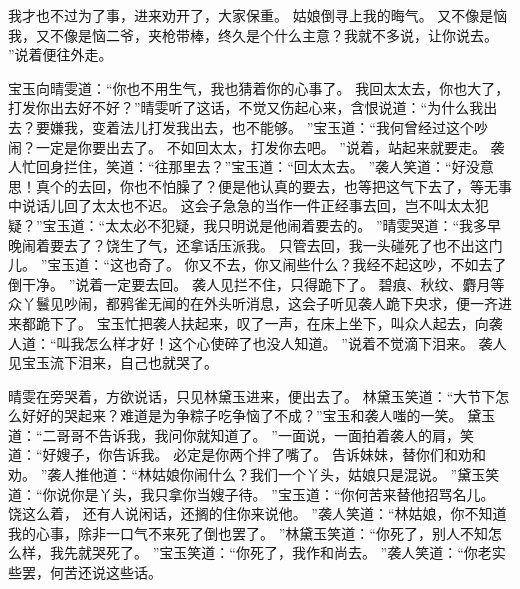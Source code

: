 我才也不过为了事，进来劝开了，大家保重。
姑娘倒寻上我的晦气。
又不像是恼我，又不像是恼二爷，夹枪带棒，终久是个什么主意？我就不多说，让你说去。
”说着便往外走。
\par
宝玉向晴雯道：“你也不用生气，我也猜着你的心事了。
我回太太去，你也大了，打发你出去好不好？”晴雯听了这话，不觉又伤起心来，含恨说道：“为什么我出去？要嫌我，变着法儿打发我出去，也不能够。
”宝玉道：“我何曾经过这个吵闹？一定是你要出去了。
不如回太太，打发你去吧。
”说着，站起来就要走。
袭人忙回身拦住，笑道：“往那里去？”宝玉道：“回太太去。
”袭人笑道：“好没意思！真个的去回，你也不怕臊了？便是他认真的要去，也等把这气下去了，等无事中说话儿回了太太也不迟。
这会子急急的当作一件正经事去回，岂不叫太太犯疑？”宝玉道：“太太必不犯疑，我只明说是他闹着要去的。
”晴雯哭道：“我多早晚闹着要去了？饶生了气，还拿话压派我。
只管去回，我一头碰死了也不出这门儿。
”宝玉道：“这也奇了。
你又不去，你又闹些什么？我经不起这吵，不如去了倒干净。
”说着一定要去回。
袭人见拦不住，只得跪下了。
碧痕、秋纹、麝月等众丫鬟见吵闹，都鸦雀无闻的在外头听消息，这会子听见袭人跪下央求，便一齐进来都跪下了。
宝玉忙把袭人扶起来，叹了一声，在床上坐下，叫众人起去，向袭人道：“叫我怎么样才好！这个心使碎了也没人知道。
”说着不觉滴下泪来。
袭人见宝玉流下泪来，自己也就哭了。
\par
晴雯在旁哭着，方欲说话，只见林黛玉进来，便出去了。
林黛玉笑道：“大节下怎么好好的哭起来？难道是为争粽子吃争恼了不成？”宝玉和袭人嗤的一笑。
黛玉道：“二哥哥不告诉我，我问你就知道了。
”一面说，一面拍着袭人的肩，笑道：“好嫂子，你告诉我。
必定是你两个拌了嘴了。
告诉妹妹，替你们和劝和劝。
”袭人推他道：“林姑娘你闹什么？我们一个丫头，姑娘只是混说。
”黛玉笑道：“你说你是丫头，我只拿你当嫂子待。
”宝玉道：“你何苦来替他招骂名儿。
饶这么着，
还有人说闲话，还搁的住你来说他。
”袭人笑道：“林姑娘，你不知道我的心事，除非一口气不来死了倒也罢了。
”林黛玉笑道：“你死了，别人不知怎么样，我先就哭死了。
”宝玉笑道：“你死了，我作和尚去。
”袭人笑道：“你老实些罢，何苦还说这些话。
